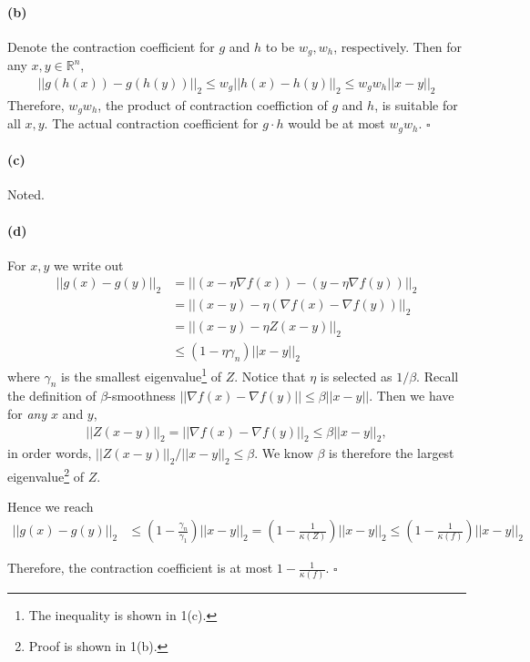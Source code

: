 \documentclass[12pt]{article}
\begin{document}
\paragraph{(b)} Denote the contraction coefficient for $g$ and $h$ to be $w_g, w_h$, respectively. Then for any $x,y \in \mathbb{R}^n$,
\begin{align*}
||g(h(x)) - g(h(y))||_2 \leq w_g ||h(x) - h(y)||_2 \leq w_g w_h ||x - y||_2
\end{align*}
Therefore, $w_g w_h$, the product of contraction coeffiction of $g$ and $h$, is suitable for all $x, y$. The actual contraction coefficient for $g\cdot h$ would be at most $w_g w_h$. $\square$

\paragraph{(c)} Noted.
\paragraph{(d)} For $x, y$ we write out 
\begin{align*}
||g(x) - g(y)||_2 &= ||(x - \eta \nabla f(x)) - (y - \eta \nabla f(y))||_2\\
&= || (x-y) - \eta\left(\nabla f(x) - \nabla f(y)\right) ||_2\\
&= || (x-y) - \eta Z\left(x - y\right) ||_2\\
&\leq (1 - \eta \gamma_n) || x-y ||_2
\end{align*}
where $\gamma_n$ is the smallest eigenvalue\footnote{The inequality is shown in 1(c).} of $Z$. Notice that $\eta$ is selected as $1/\beta$. Recall the definition of $\beta$-smoothness $||\nabla f(x) - \nabla f(y) || \leq \beta ||x - y||$. Then we have for \emph{any} $x$ and $y$, 
\begin{align*}
||Z(x-y)||_2 = ||\nabla f(x) - \nabla f(y) ||_2 \leq \beta ||x - y||_2,
\end{align*}
in order words, $||Z(x-y)||_2/||x - y||_2 \leq \beta$. We know $\beta$ is therefore the largest eigenvalue\footnote{Proof is shown in 1(b).} of $Z$. 

Hence we reach 
\begin{align*}
||g(x) - g(y)||_2 &\leq \left(1 - \frac{\gamma_n}{\gamma_1}\right) || x-y ||_2 = \left(1 - \frac{1}{\kappa(Z)}\right) || x-y ||_2 \leq \left(1-\frac{1}{\kappa(f)}\right) || x-y ||_2
\end{align*}

Therefore, the contraction coefficient is at most $1-\frac{1}{\kappa(f)}$. $\square$
\end{document}
